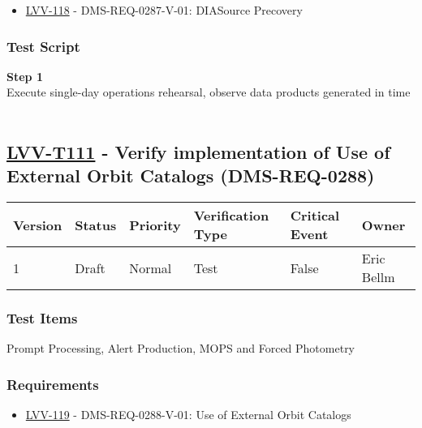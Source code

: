 \begin{itemize}
\tightlist
\item
  \href{https://jira.lsstcorp.org/browse/LVV-118}{LVV-118} -
  DMS-REQ-0287-V-01: DIASource Precovery
\end{itemize}

\hypertarget{test-script-87}{%
\subsubsection{Test Script}\label{test-script-87}}

\textbf{Step 1}\\
Execute single-day operations rehearsal, observe data products generated
in time\\
~\\

\hypertarget{lvv-t111---verify-implementation-of-use-of-external-orbit-catalogs-dms-req-0288}{%
\subsection{\texorpdfstring{\href{https://jira.lsstcorp.org/secure/Tests.jspa\#/testCase/LVV-T111}{LVV-T111}
- Verify implementation of Use of External Orbit Catalogs
(DMS-REQ-0288)}{LVV-T111 - Verify implementation of Use of External Orbit Catalogs (DMS-REQ-0288)}}\label{lvv-t111---verify-implementation-of-use-of-external-orbit-catalogs-dms-req-0288}}

\begin{longtable}[]{@{}llllll@{}}
\toprule
Version & Status & Priority & Verification Type & Critical Event &
Owner\tabularnewline
\midrule
\endhead
1 & Draft & Normal & Test & False & Eric Bellm\tabularnewline
\bottomrule
\end{longtable}

\hypertarget{test-items-87}{%
\subsubsection{Test Items}\label{test-items-87}}

Prompt Processing, Alert Production, MOPS and Forced Photometry~

\hypertarget{requirements-88}{%
\subsubsection{Requirements}\label{requirements-88}}

\begin{itemize}
\tightlist
\item
  \href{https://jira.lsstcorp.org/browse/LVV-119}{LVV-119} -
  DMS-REQ-0288-V-01: Use of External Orbit Catalogs
\end{itemize}

